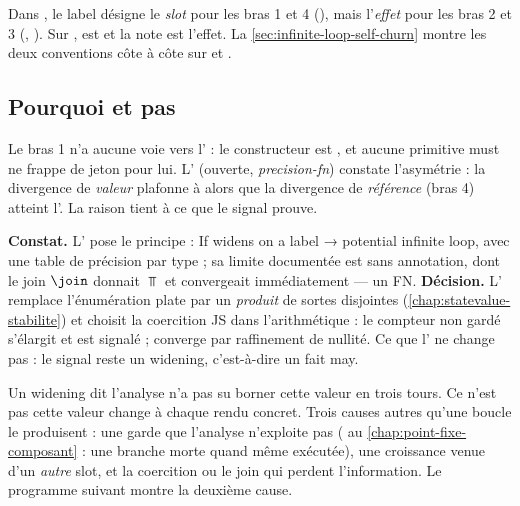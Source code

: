 \begin{piege}
Dans \og \code{[hook:0]}\fg, le label désigne le \emph{slot} pour les bras 1 et 4 (), mais l'\emph{effet} pour les bras 2 et 3 (, ). Sur , \code{[hook:0]} est  et la note \code{[hook:1]} est l'effet. La \cref{sec:infinite-loop-self-churn} montre les deux conventions côte à côte sur  et .
\end{piege}

\subsection{Pourquoi \Warning{} et pas \Error}
\label{sec:infinite-loop-plafond}

Le bras 1 n'a aucune voie vers l'\Error{} : le constructeur est , et aucune primitive must ne frappe de jeton pour lui. L' (ouverte, \emph{precision-fn}) constate l'asymétrie : la divergence de \emph{valeur} plafonne à \Warning{} alors que la divergence de \emph{référence} (bras 4) atteint l'\Error. La raison tient à ce que le signal prouve.

\begin{decision}
\textbf{Constat.} L' pose le principe : \og If  widens on a label → potential infinite loop\fg, avec une table de précision par type ; sa limite documentée est  sans annotation, dont le join  $\join$  donnait $\Top$ et convergeait immédiatement --- un FN.
\textbf{Décision.} L' remplace l'énumération plate par un \emph{produit} de sortes disjointes (\cref{chap:statevalue-stabilite}) et choisit la coercition JS  dans l'arithmétique : le compteur  non gardé s'élargit et est signalé ;  converge par raffinement de nullité. Ce que l' ne change pas : le signal reste un widening, c'est-à-dire un fait may.
\end{decision}

Un widening dit \og l'analyse n'a pas su borner cette valeur en trois tours\fg. Ce n'est pas \og cette valeur change à chaque rendu concret\fg. Trois causes autres qu'une boucle le produisent : une garde que l'analyse n'exploite pas ( au \cref{chap:point-fixe-composant} : une branche morte quand même exécutée), une croissance venue d'un \emph{autre} slot, et la coercition ou le join qui perdent l'information. Le programme suivant montre la deuxième cause.

